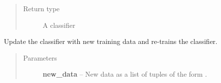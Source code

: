 \documentclass[letterpaper,10pt,english]{sphinxmanual}
\begin{document}
\begin{fulllineitems}
\begin{fulllineitems}
\begin{quote}\begin{description}
\item[{Return type}] \leavevmode
A classifier

\end{description}\end{quote}

\end{fulllineitems}


\begin{fulllineitems}
\label{api_reference:textblob.classifiers.DecisionTreeClassifier.update}
Update the classifier with new training data and re-trains the
classifier.
\begin{quote}\begin{description}
\item[{Parameters}] \leavevmode
\textbf{new\_data} -- New data as a list of tuples of the form
.

\end{description}\end{quote}

\end{fulllineitems}


\end{fulllineitems}

\end{document}
